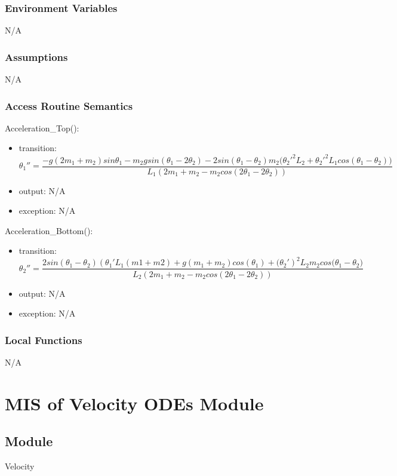 \documentclass[12pt, titlepage]{article}
\begin{document}
\subsubsection{Environment Variables}
N/A
\subsubsection{Assumptions}
N/A
\subsubsection{Access Routine Semantics}

\noindent Acceleration\_Top():
\begin{itemize}
\item transition: \[{\theta_1}''=\frac{-g(2m_1+m_2)sin\theta_1-m_2gsin(\theta_1-2\theta_2)-2sin(\theta_1-\theta_2)m_2({{\theta_2}'}^2L_2+{{\theta_2}'}^2L_1cos(\theta_1-\theta_2)\big)}{L_1(2m_1+m_2-m_2cos(2\theta_1-2\theta_2))}\] 
\item output: N/A
\item exception: N/A
\end{itemize}

\noindent Acceleration\_Bottom():
\begin{itemize}
\item transition: \[{\theta_2}''=\frac{2sin(\theta_1-\theta_2)({\theta_1}'L_1(m1+m2)+g(m_1+m_2)cos(\theta_1)+{(\theta_2}')^2L_2m_2cos(\theta_1-\theta_2\big)}{L_2(2m_1+m_2-m_2cos(2\theta_1-2\theta_2))}\] 
\item output: N/A
\item exception: N/A
\end{itemize}

\subsubsection{Local Functions}

N/A
\newpage


\section{MIS of Velocity ODEs Module} \label{VOModule} 
 
\subsection{Module}
Velocity 
\end{document}
